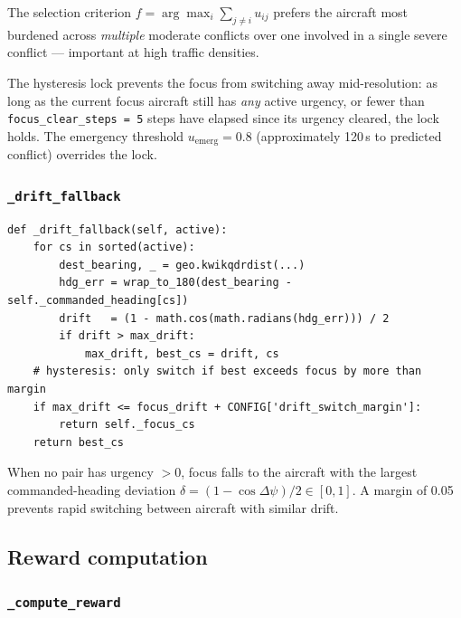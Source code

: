 \documentclass[11pt, a4paper]{article}
\begin{document}
The selection criterion $f = \arg\max_i \sum_{j \ne i} u_{ij}$ prefers the
aircraft most burdened across \emph{multiple} moderate conflicts over one
involved in a single severe conflict --- important at high traffic densities.

The hysteresis lock prevents the focus from switching away mid-resolution:
as long as the current focus aircraft still has \emph{any} active urgency,
or fewer than \texttt{focus\_clear\_steps = 5} steps have elapsed since its
urgency cleared, the lock holds.
The emergency threshold $u_\text{emerg} = 0.8$ (approximately 120\,s to
predicted conflict) overrides the lock.

\subsubsection{\texttt{\_drift\_fallback}}

\begin{lstlisting}[caption={Fallback selection when no conflicts are active.}]
def _drift_fallback(self, active):
    for cs in sorted(active):
        dest_bearing, _ = geo.kwikqdrdist(...)
        hdg_err = wrap_to_180(dest_bearing - self._commanded_heading[cs])
        drift   = (1 - math.cos(math.radians(hdg_err))) / 2
        if drift > max_drift:
            max_drift, best_cs = drift, cs
    # hysteresis: only switch if best exceeds focus by more than margin
    if max_drift <= focus_drift + CONFIG['drift_switch_margin']:
        return self._focus_cs
    return best_cs
\end{lstlisting}

When no pair has urgency $>0$, focus falls to the aircraft with the largest
commanded-heading deviation $\delta = (1 - \cos\Delta\psi)/2 \in [0,1]$.
A margin of 0.05 prevents rapid switching between aircraft with similar drift.

\subsection{Reward computation}

\subsubsection{\texttt{\_compute\_reward}}
\end{document}
